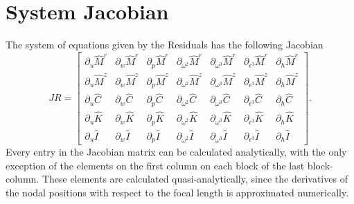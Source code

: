 \documentclass{article}
\begin{document}
\section{System Jacobian}
The system of equations given by the Residuals has the following Jacobian
\begin{equation}
JR =
\begin{bmatrix}
\partial_u \hat{M}^r & \partial_w \hat{M}^r & \partial_p \hat{M}^r & \partial_{\omega^2} \hat{M}^r & \partial_{\omega^3} \hat{M}^r & \partial_{\epsilon^3} \hat{M}^r & \partial_h \hat{M}^r \\
\partial_u \hat{M}^z & \partial_w \hat{M}^z & \partial_p \hat{M}^z & \partial_{\omega^2} \hat{M}^z & \partial_{\omega^3} \hat{M}^z & \partial_{\epsilon^3} \hat{M}^z & \partial_h \hat{M}^z \\
\partial_u \hat{C}   & \partial_w \hat{C}   & \partial_p \hat{C}   & \partial_{\omega^2} \hat{C}   & \partial_{\omega^3} \hat{C}   & \partial_{\epsilon^3} \hat{C}   & \partial_h \hat{C}   \\
\partial_u \hat{K}   & \partial_w \hat{K}   & \partial_p \hat{K}   & \partial_{\omega^2} \hat{K}   & \partial_{\omega^3} \hat{K}   & \partial_{\epsilon^3} \hat{K}   & \partial_h \hat{K}   \\
\partial_u \hat{I}   & \partial_w \hat{I}   & \partial_p \hat{I}   & \partial_{\omega^2} \hat{I}   & \partial_{\omega^3} \hat{I}   & \partial_{\epsilon^3} \hat{I}   & \partial_h \hat{I}   
\end{bmatrix}. \tag{18.1}
\end{equation}
Every entry in the Jacobian matrix can be calculated analytically, with the only exception of the elements on the first column on each block of the last block-column. These elements are calculated quasi-analytically, since the derivatives of the nodal positions with respect to the focal length is approximated numerically.
\end{document}
